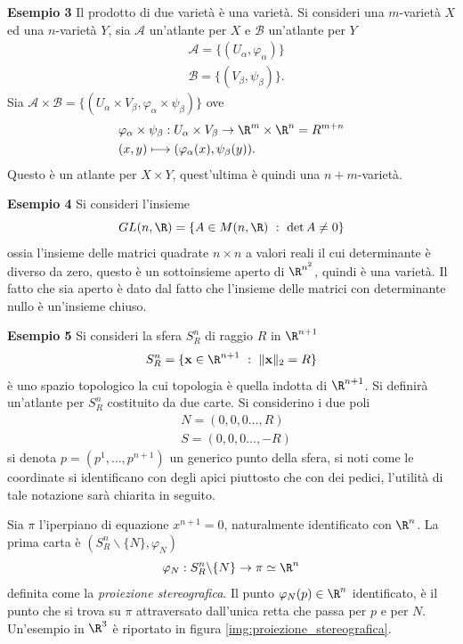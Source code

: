 \documentclass[10pt, letterpaper]{report}
\begin{document}
\noindent\textbf{Esempio 3} Il prodotto di due varietà è una varietà. Si consideri una $m$-varietà $X$ ed una $n$-varietà $Y$, sia $\mathcal A$ un'atlante per $X$ e $\mathcal B$ un'atlante per $Y$\begin{align}
    &\mathcal A = \{(U_\alpha,\varphi_\alpha)\}\\
    &\mathcal B = \{(V_\beta,\psi_\beta)\}.
\end{align}
Sia $\mathcal A\times \mathcal B=\{(U_\alpha\times V_\beta,\varphi_\alpha\times \psi_\beta)\}$ ove\begin{align}
    &\varphi_\alpha\times\psi_\beta:U_\alpha\times V_\beta\rightarrow\R^m\times \R^n=R^{m+n}\\ &
    (x,y)\longmapsto (\varphi_\alpha(x),\psi_\beta(y)).
\end{align}
Questo è un atlante per $X\times Y$, quest'ultima è quindi una $n+m$-varietà.
\bigskip

\noindent\textbf{Esempio 4} Si consideri l'insieme \begin{equation}
    GL(n,\R)=\{A\in M(n,\R) \ : \ \det A\ne 0\}
\end{equation}
ossia l'insieme delle matrici quadrate $n\times n$ a valori reali il cui determinante è diverso da zero, questo è un sottoinsieme aperto di $\R^{n^2}$, quindi è una varietà. Il fatto che sia aperto è dato dal fatto che l'insieme delle matrici con determinante nullo è un'insieme chiuso.
\bigskip

\noindent\textbf{Esempio 5} Si consideri la sfera $S_R^{n}$ di raggio $R$ in $\R^{n+1}$
\begin{equation}
    S^{n}_R=\{\mathbf x\in\R^{n+1} \ : \ \|\mathbf x\|_2=R\}
\end{equation}
è uno spazio topologico la cui topologia è quella indotta di $\R^{n+1}$. Si definirà un'atlante per $S_R^{n}$ costituito da due carte.
Si considerino i due poli\begin{align}
    &N=(0,0,0\dots,R)\\
    &S=(0,0,0\dots,-R)
\end{align}
si denota $p=(p^1,\dots,p^{n+1})$ un generico punto della sfera, si noti come le coordinate si identificano con degli apici piuttosto che con dei pedici, l'utilità di tale notazione sarà chiarita in seguito.
    
Sia $\pi$ l'iperpiano di equazione $x^{n+1}=0$, naturalmente identificato con $\R^n$. La prima carta è $(S_R^{n}\backslash\{N\},\varphi_N)$ \begin{equation}
    \varphi_N:S_R^{n}\backslash\{N\}\rightarrow\pi\simeq\R^n
\end{equation}
definita come la \textit{proiezione stereografica}. Il punto $\varphi_N(p)\in\R^n$ identificato, è il punto che si trova su $\pi$ attraversato dall'unica retta che passa per $p$ e per $N$. Un'esempio in $\R^3$ è riportato in figura \ref{img:proiezione_stereografica}.
\end{document}
